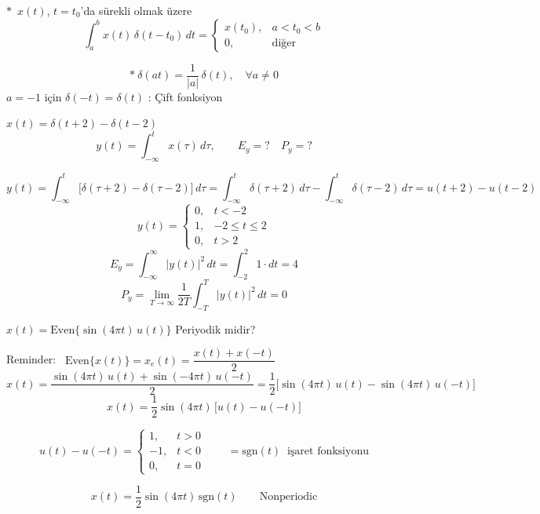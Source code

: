\documentclass[11pt,a4paper]{article}
\begin{document}
$\ast$\ $x(t)$, $t=t_0$'da sürekli olmak üzere
\[ \int_{a}^{b} x(t)\,\delta(t-t_0)\,dt = \begin{cases} x(t_0), & a < t_0 < b \\ 0, & \text{diğer} \end{cases} \]

\[ \ast\ \delta(at) = \frac{1}{|a|}\,\delta(t), \quad \forall a \neq 0 \]
$a=-1$ için $\delta(-t) = \delta(t)$ : Çift fonksiyon

\begin{ornek}[(Ex)]
$x(t) = \delta(t+2) - \delta(t-2)$
\[ y(t) = \int_{-\infty}^{t} x(\tau)\,d\tau, \qquad E_y = ? \quad P_y = ? \]
\end{ornek}
\begin{cozum}
\[ y(t) = \int_{-\infty}^{t} \bigl[\delta(\tau+2) - \delta(\tau-2)\bigr]\,d\tau = \int_{-\infty}^{t} \delta(\tau+2)\,d\tau - \int_{-\infty}^{t} \delta(\tau-2)\,d\tau = u(t+2) - u(t-2) \]
\[ y(t) = \begin{cases} 0, & t < -2 \\ 1, & -2 \leq t \leq 2 \\ 0, & t > 2 \end{cases} \]
\[ E_y = \int_{-\infty}^{\infty} |y(t)|^2\,dt = \int_{-2}^{2} 1\cdot dt = 4 \]
\[ P_y = \lim_{T\to\infty} \frac{1}{2T} \int_{-T}^{T} |y(t)|^2\,dt = 0 \]
\end{cozum}

\begin{ornek}[(Ex)]
$x(t) = \mathrm{Even}\bigl\{\sin(4\pi t)\,u(t)\bigr\}$ \quad Periyodik midir?
\end{ornek}
\begin{cozum}
Reminder: \ $\mathrm{Even}\{x(t)\} = x_e(t) = \dfrac{x(t) + x(-t)}{2}$
\[ x(t) = \frac{\sin(4\pi t)\,u(t) + \sin(-4\pi t)\,u(-t)}{2} = \frac{1}{2}\bigl[\sin(4\pi t)\,u(t) - \sin(4\pi t)\,u(-t)\bigr] \]
\[ x(t) = \frac{1}{2}\sin(4\pi t)\,\bigl[u(t) - u(-t)\bigr] \]

\noindent
\begin{minipage}[c]{0.32\linewidth}
\centering
{}
\end{minipage}\hfill
\begin{minipage}[c]{0.64\linewidth}
\[ u(t) - u(-t) = \begin{cases} 1, & t > 0 \\ -1, & t < 0 \\ 0, & t = 0 \end{cases} \qquad = \mathrm{sgn}(t) \ \text{ işaret fonksiyonu} \]
\end{minipage}

\[ x(t) = \frac{1}{2}\sin(4\pi t)\,\mathrm{sgn}(t) \qquad \text{Nonperiodic} \]
\end{cozum}
\end{document}
